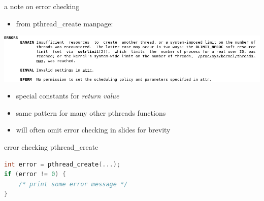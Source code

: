 \begin{frame}{a note on error checking}
\begin{itemize}
\item from pthread\_create manpage:
\end{itemize}
\includegraphics[width=\textwidth]{../threads/pthread-create-errors}
\begin{itemize}
\item special constants for \textit{return value}
\vspace{.5cm}
\item same pattern for many other pthreads functions
\item will often omit error checking in slides for brevity
\end{itemize}
\end{frame}

\begin{frame}[fragile,label=pthreadCreateErrorCheck]{error checking pthread\_create}
\begin{lstlisting}[language=C++,style=small]
int error = pthread_create(...);
if (error != 0) {
    /* print some error message */
}
\end{lstlisting}
\end{frame}
